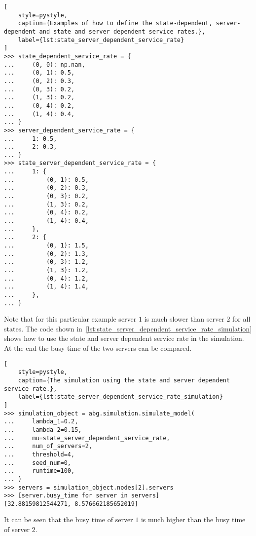\begin{lstlisting}[
    style=pystyle,
    caption={Examples of how to define the state-dependent, server-dependent and state and server dependent service rates.},
    label={lst:state_server_dependent_service_rate}
]
>>> state_dependent_service_rate = {
...     (0, 0): np.nan,
...     (0, 1): 0.5,
...     (0, 2): 0.3,
...     (0, 3): 0.2,
...     (1, 3): 0.2,
...     (0, 4): 0.2,
...     (1, 4): 0.4,
... }
>>> server_dependent_service_rate = {
...     1: 0.5,
...     2: 0.3,
... }
>>> state_server_dependent_service_rate = {
...     1: {
...         (0, 1): 0.5,
...         (0, 2): 0.3,
...         (0, 3): 0.2,
...         (1, 3): 0.2,
...         (0, 4): 0.2,
...         (1, 4): 0.4,
...     },
...     2: {
...         (0, 1): 1.5,
...         (0, 2): 1.3,
...         (0, 3): 1.2,
...         (1, 3): 1.2,
...         (0, 4): 1.2,
...         (1, 4): 1.4,
...     },
... }

\end{lstlisting}

Note that for this particular example server \(1\) is much slower than server
\(2\) for all states.
The code shown in~\ref{lst:state_server_dependent_service_rate_simulation}
shows how to use the state and server dependent service rate in the simulation.
At the end the busy time of the two servers can be compared.

\begin{lstlisting}[
    style=pystyle,
    caption={The simulation using the state and server dependent service rate.},
    label={lst:state_server_dependent_service_rate_simulation}
]
>>> simulation_object = abg.simulation.simulate_model(
...     lambda_1=0.2,
...     lambda_2=0.15,
...     mu=state_server_dependent_service_rate,
...     num_of_servers=2,
...     threshold=4,
...     seed_num=0,
...     runtime=100,
... )
>>> servers = simulation_object.nodes[2].servers
>>> [server.busy_time for server in servers]
[32.88159812544271, 8.576662185652019]

\end{lstlisting}

It can be seen that the busy time of server \(1\) is much higher than the busy
time of server \(2\).
